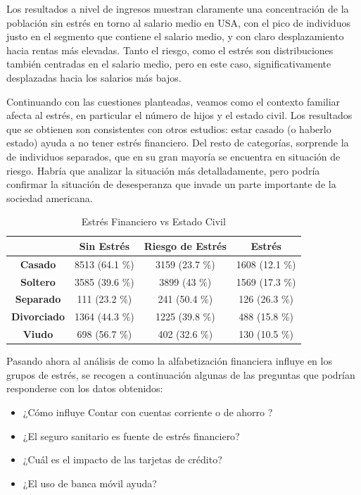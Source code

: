 \documentclass[a4paper, 11pt]{article}
\begin{document}
Los resultados a nivel de ingresos muestran claramente una 
concentración de la población sin estrés en torno al salario medio en USA, 
con el pico de individuos justo en el segmento que contiene el salario
medio, y con claro desplazamiento hacia rentas más elevadas. Tanto el riesgo, como 
el estrés son distribuciones también centradas en el salario medio, pero en este 
caso, significativamente desplazadas hacia los salarios más bajos. 

Continuando con las cuestiones planteadas, veamos como el contexto familiar afecta
al estrés, en particular el número de hijos y el estado civil. Los resultados que
se obtienen son consistentes con otros estudios: estar casado (o haberlo estado) 
ayuda a no tener estrés financiero. Del resto de categorías, sorprende la de 
individuos separados, que en su gran mayoría se encuentra en situación de riesgo.
Habría que analizar la situación más detalladamente, pero podría confirmar la 
situación de desesperanza que invade un parte importante de la sociedad americana.

\begin{table}[ht]
\centering
\begin{tabular}{cccc }
\toprule
 & \textbf{Sin Estrés} & \textbf{Riesgo de Estrés} & \textbf{Estrés}\\
\midrule
\textbf{Casado} & 8513 (64.1 \%) &	3159 (23.7 \%) &	1608 (12.1 \%)\\
\textbf{Soltero} & 3585 (39.6 \%) &	3899 (43 \%) &	1569 (17.3 \%)\\
\textbf{Separado} & 111 (23.2 \%) &	241 (50.4 \%) &	126 (26.3 \%)\\
\textbf{Divorciado} & 1364 (44.3 \%) &	1225 (39.8 \%) &	488 (15.8 \%)\\
\textbf{Viudo} & 698 (56.7 \%) &	402 (32.6 \%) &	130 (10.5 \%)\\
\bottomrule
\end{tabular}
\caption{Estrés Financiero vs Estado Civil}
\label{tab:stress_vs_marital}
\end{table}

Pasando ahora al análisis de como la alfabetización financiera influye en los
grupos de estrés, se recogen a continuación algunas de las preguntas que 
podrían responderse con los datos obtenidos:
\begin{itemize}
    \item ¿Cómo influye Contar con cuentas corriente o de ahorro ?
    \item ¿El seguro sanitario es fuente de estrés financiero?
    \item ¿Cuál es el impacto de las tarjetas de crédito?
    \item ¿El uso de banca móvil ayuda?
\end{itemize}
\end{document}
